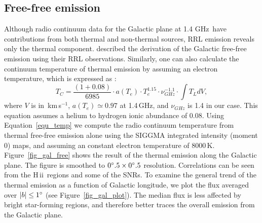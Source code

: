 \documentclass[manuscript]{aastex61}
\newcommand{\hii}{{\rm H\,}{{\sc ii}}}
\newcommand{\kms}{\,km\,s$^{-1}$}
\newcommand{\ghz}{\,GHz}
\begin{document}
\subsection{Free-free emission} \label{sec_gal_free}
Although radio continuum data for the Galactic plane at 1.4\,\ghz\ have contributions from both thermal and non-thermal sources, RRL emission reveals only the thermal component.
\citet{Alves2012} described the derivation of the Galactic free-free emission using their RRL observations.
Similarly, one can also calculate the continuum temperature of thermal emission by assuming an electron temperature, which is expressed as \citep{Mezger1967a, Lockman1978, Quireza2006a}:
\begin{equation}
  T_C=
  \frac{(1+0.08)}{6985}\cdot a(T_e) \cdot T_e^{1.15} \cdot \nu _{GHz}^{-1.1} \cdot \int T_L dV,
  \label{equ_temp}
\end{equation}
where $V$ is in \kms, $a(T_e) \simeq 0.97$ at 1.4\ghz, and $\nu_{GHz}$ is 1.4 in our case.  This equation assumes a helium to hydrogen ionic abundance of 0.08.
Using Equation~\ref{equ_temp} we compute the radio continuum temperature from thermal free-free emission alone using the SIGGMA integrated intensity (moment 0) maps, and assuming an constant electron temperature of 8000\,K.
Figure~\ref{fig_gal_free} shows the result of the thermal emission along the Galactic plane.
The figure is smoothed to $0\mbox{$^\circ$}.5 \times 0\mbox{$^\circ$}.5$ resolution.
Correlations can be seen from the \hii\ regions and some of the SNRs.
To examine the general trend of the thermal emission as a function of Galactic longitude, we plot the flux averaged over $|b| \leq 1\mbox{$^\circ$}$ (see Figure~\ref{fig_gal_plot}). 
The median flux is less affected by bright star-forming regions, and therefore better traces the overall emission from the Galactic plane.
\end{document}
